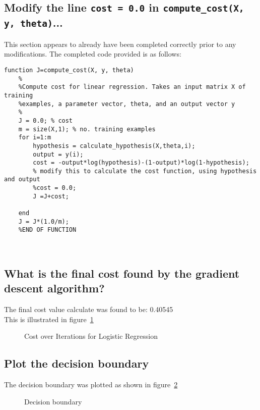 \documentclass[titlepage]{scrartcl}
\newcommand{\code}[1]{\texttt{#1}}
\begin{document}
\subsection{Modify the line \code{cost = 0.0} in \code{compute\_cost(X, y,
theta)}...}
This section appears to already have been completed correctly prior to any
modifications. The completed code provided is as follows:

\begin{lstlisting}
function J=compute_cost(X, y, theta)
    %
    %Compute cost for linear regression. Takes an input matrix X of training
    %examples, a parameter vector, theta, and an output vector y
    %
    J = 0.0; % cost
    m = size(X,1); % no. training examples
    for i=1:m
        hypothesis = calculate_hypothesis(X,theta,i);
        output = y(i);
        cost = -output*log(hypothesis)-(1-output)*log(1-hypothesis);
        % modify this to calculate the cost function, using hypothesis and output
        %cost = 0.0;
        J =J+cost;
        
    end
    J = J*(1.0/m);
    %END OF FUNCTION
\end{lstlisting}\leavevmode \\

\subsection{What is the final cost found by the gradient descent algorithm?}
The final cost value calculate was found to be: 0.40545\\
This is illustrated in figure~\ref{LRCostEx1}

\begin{figure}
    \caption{Cost over Iterations for Logistic Regression}
    \label{LRCostEx1}
\end{figure}

\subsection{Plot the decision boundary}
The decision boundary was plotted as shown in figure~\ref{LRBoundary}

\begin{figure}
    \caption{Decision boundary}
    \label{LRBoundary}
\end{figure}
\end{document}
